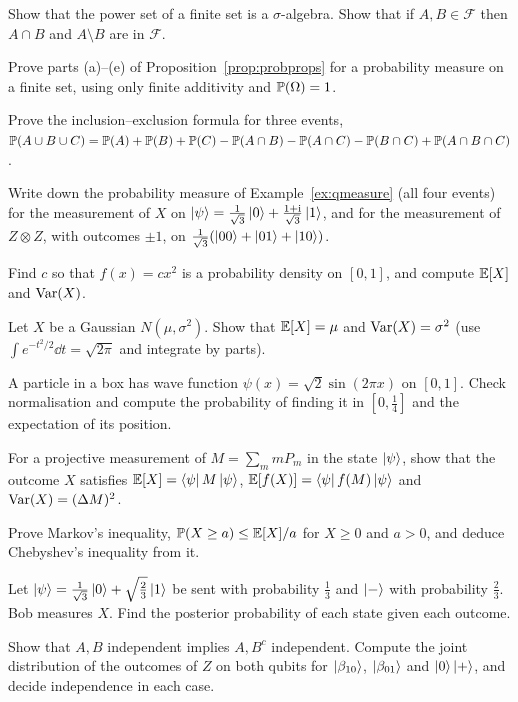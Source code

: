 \begin{exerciseset}
   Show that the power set of a finite set is a $\sigma$-algebra. Show that if $A,B\in\mathcal F$ then $A\cap B$ and $A\setminus B$ are in $\mathcal F$.

   Prove parts (a)--(e) of Proposition~\ref{prop:probprops} for a probability measure on a finite set, using only finite additivity and $\mathbb{P}(\Omega)=1$.

   Prove the inclusion--exclusion formula for three events, $\mathbb{P}(A\cup B\cup C)=\mathbb{P}(A)+\mathbb{P}(B)+\mathbb{P}(C)-\mathbb{P}(A\cap B)-\mathbb{P}(A\cap C)-\mathbb{P}(B\cap C)+\mathbb{P}(A\cap B\cap C)$.

   Write down the probability measure of Example~\ref{ex:qmeasure} (all four events) for the measurement of $X$ on $\left|\psi\right\rangle=\frac1{\sqrt3}\left|0\right\rangle+\frac{1+\mathrm{i}}{\sqrt3}\left|1\right\rangle$, and for the measurement of $Z\otimes Z$, with outcomes $\pm1$, on $\frac1{\sqrt3}(\left|00\right\rangle+\left|01\right\rangle+\left|10\right\rangle)$.

   Find $c$ so that $f(x)=cx^2$ is a probability density on $[0,1]$, and compute $\mathbb{E}[X]$ and $\operatorname{Var}(X)$.

   Let $X$ be a Gaussian $N(\mu,\sigma^2)$. Show that $\mathbb{E}[X]=\mu$ and $\operatorname{Var}(X)=\sigma^2$ (use $\int e^{-t^2/2}\dd t=\sqrt{2\pi}$ and integrate by parts).

   A particle in a box has wave function $\psi(x)=\sqrt2\sin(2\pi x)$ on $[0,1]$. Check normalisation and compute the probability of finding it in $[0,\tfrac14]$ and the expectation of its position.

   For a projective measurement of $M=\sum_mmP_m$ in the state $\left|\psi\right\rangle$, show that the outcome $X$ satisfies $\mathbb{E}[X]=\left\langle\psi\right| M\left|\psi\right\rangle$, $\mathbb{E}[f(X)]=\left\langle\psi\right| f(M)\left|\psi\right\rangle$ and $\operatorname{Var}(X)=(\Delta M)^2$.

   Prove Markov's inequality, $\mathbb{P}(X\ge a)\le\mathbb{E}[X]/a$ for $X\ge0$ and $a>0$, and deduce Chebyshev's inequality from it.

   Let $\left|\psi\right\rangle=\frac1{\sqrt3}\left|0\right\rangle+\sqrt{\tfrac23}\left|1\right\rangle$ be sent with probability $\tfrac13$ and $\left|-\right\rangle$ with probability $\tfrac23$. Bob measures $X$. Find the posterior probability of each state given each outcome.

   Show that $A,B$ independent implies $A,B^c$ independent. Compute the joint distribution of the outcomes of $Z$ on both qubits for $\left|\beta_{10}\right\rangle$, $\left|\beta_{01}\right\rangle$ and $\left|0\right\rangle\left|+\right\rangle$, and decide independence in each case.


\end{exerciseset}

